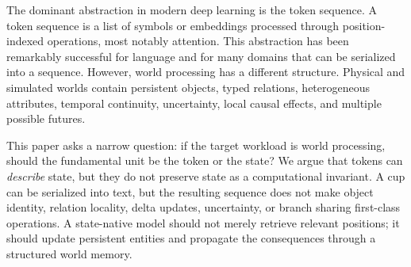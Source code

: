 \documentclass[11pt]{article}
\begin{document}
The dominant abstraction in modern deep learning is the token sequence. A token
sequence is a list of symbols or embeddings processed through position-indexed
operations, most notably attention. This abstraction has been remarkably
successful for language and for many domains that can be serialized into a
sequence. However, world processing has a different structure. Physical and
simulated worlds contain persistent objects, typed relations, heterogeneous
attributes, temporal continuity, uncertainty, local causal effects, and multiple
possible futures.

This paper asks a narrow question: if the target workload is world processing,
should the fundamental unit be the token or the state? We argue that tokens can
\emph{describe} state, but they do not preserve state as a computational
invariant. A cup can be serialized into text, but the resulting sequence does
not make object identity, relation locality, delta updates, uncertainty, or
branch sharing first-class operations. A state-native model should not merely
retrieve relevant positions; it should update persistent entities and propagate
the consequences through a structured world memory.
\end{document}
